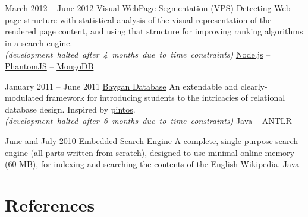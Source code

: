 \documentclass{tccv}
\begin{document}
{{\begin{project_list}
\item{March 2012 -- June 2012}
     {}
     {Visual WebPage Segmentation {\large (VPS)}}
	 {Detecting Web page structure with statistical \mbox{analysis} of the visual representation of the rendered page \mbox{content}, and using that structure for improving ranking algorithms in a search engine.\\[1.5pt]%
\mbox{\small\it(development halted after 4 months due to time constraints)}%
}
	 {%
	 	\href{http://nodejs.org}{Node.js} -- %
		\href{http://phantomjs.org}{PhantomJS} -- %
		\href{http://www.mongodb.org}{MongoDB}%
	 }

\vspace{-6pt}

\item{January 2011 -- June 2011}
	 {}
	 {\href{https://github.com/baygan/Baygan}{Baygan Database}}
	 {An extendable and clearly-modulated framework for introducing students to the intricacies of relational database design. Inspired by \href{http://www.stanford.edu/class/cs140/projects/pintos/pintos.html}{pintos}.\\[1.5pt]%
\mbox{\small\it(development halted after 6 months due to time constraints)}%
}
	 {%
	 	\href{http://www.oracle.com/technetwork/java/}{Java} -- %
		\href{http://www.antlr.org}{ANTLR}%
	 }

\vspace{-6pt}
	 
\item{June and July 2010}
	 {}
	 {Embedded Search Engine}
	 {A complete, single-purpose search engine (all parts \mbox{written} from scratch), designed to use minimal online memory (60 MB), for indexing and searching the contents of the English Wikipedia.}
	 {%
		 \href{http://www.oracle.com/technetwork/java/}{Java}%
	 }

\end{project_list}



\vspace{-10pt}










\section{References}

}}
\end{document}
